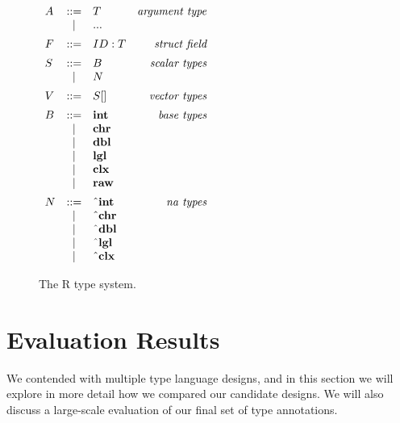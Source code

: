 \documentclass[acmsmall,review,anonymous]{acmart}\settopmatter{printfolios=true,printccs=false,printacmref=false}
\begin{document}
\begin{figure}
\begin{minipage}{.45\linewidth}
    \begin{flushright}
    $ \begin{array}{lclr}
    A & ::= & T & \text{\it argument type} \\
      & |   & {\bf ...} \vspace{5pt} \\
    F & ::= & ID : T & \text{\it struct field}\vspace{5pt}\\
    S & ::= & B & \text{\it scalar types} \\
      & |   & N \vspace{5pt}\\
    V & ::= & S \lbrack \rbrack & \text{\it vector types} \vspace{5pt}\\
    B & ::= & {\bf int} & \text{\it base types} \\
      & |   & {\bf chr} \\
      & |   & {\bf dbl} \\
      & |   & {\bf lgl} \\
      & |   & {\bf clx} \\
      & |   & {\bf raw} \vspace{5pt}\\
    N & ::= & {\bf \string^int} & \text{\it na types} \\
      & |   & {\bf \string^chr} \\
      & |   & {\bf \string^dbl} \\
      & |   & {\bf \string^lgl} \\
      & |   & {\bf \string^clx} \\
\end{array} $
    \end{flushright}
    \end{minipage}
    \caption{The R type system.}
    \label{fig:types}
\end{figure}

%
%
%
%
%
%
\section{Evaluation Results}
\label{sec:evaluation}

We contended with multiple type language designs, and in this section we will explore in more detail how we compared our candidate designs.
We will also discuss a large-scale evaluation of our final set of type annotations.
\end{document}

